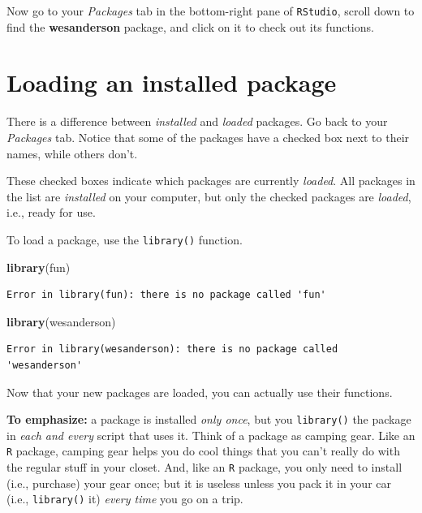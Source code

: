 \documentclass[]{book}
\newenvironment{Shaded}{\begin{snugshade}}{\end{snugshade}}
\newcommand{\KeywordTok}[1]{\textcolor[rgb]{0.13,0.29,0.53}{\textbf{#1}}}
\newcommand{\NormalTok}[1]{#1}
\begin{document}
Now go to your \emph{Packages} tab in the bottom-right pane of \texttt{RStudio}, scroll down to find the \textbf{wesanderson} package, and click on it to check out its functions.

\hypertarget{loading-an-installed-package}{%
\section*{Loading an installed package}\label{loading-an-installed-package}}

There is a difference between \emph{installed} and \emph{loaded} packages. Go back to your \emph{Packages} tab. Notice that some of the packages have a checked box next to their names, while others don't.

These checked boxes indicate which packages are currently \emph{loaded}. All packages in the list are \emph{installed} on your computer, but only the checked packages are \emph{loaded}, i.e., ready for use.

To load a package, use the \texttt{library()} function.

\begin{Shaded}
\begin{Highlighting}[]
\KeywordTok{library}\NormalTok{(fun)}
\end{Highlighting}
\end{Shaded}

\begin{verbatim}
Error in library(fun): there is no package called 'fun'
\end{verbatim}

\begin{Shaded}
\begin{Highlighting}[]
\KeywordTok{library}\NormalTok{(wesanderson)}
\end{Highlighting}
\end{Shaded}

\begin{verbatim}
Error in library(wesanderson): there is no package called 'wesanderson'
\end{verbatim}

Now that your new packages are loaded, you can actually use their functions.

\textbf{To emphasize:} a package is installed \emph{only once}, but you \texttt{library()} the package in \emph{each and every} script that uses it. Think of a package as camping gear. Like an \texttt{R} package, camping gear helps you do cool things that you can't really do with the regular stuff in your closet. And, like an \texttt{R} package, you only need to install (i.e., purchase) your gear once; but it is useless unless you pack it in your car (i.e., \texttt{library()} it) \emph{every time} you go on a trip.
\end{document}
